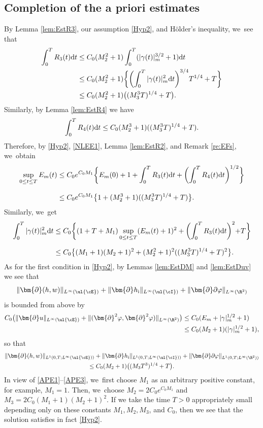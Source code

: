 \subsection{Completion of the a priori estimates}\label{sectAPE}
By Lemma \ref{lem:EstR3}, our assumption \eqref{Hyp2}, and Hölder's inequality, we~see that
\begin{align*}
\int_0^TR_3(t){\rm d}t
&\leq C_0(M_2^2+1)\int_0^T(|\gamma(t)|_m^{3/2}+1){\rm d}t \\
&\leq C_0(M_2^2+1)\biggl\{ \biggl(\int_0^T|\gamma(t)|_m^2{\rm d}t\biggr)^{3/4}T^{1/4} + T \biggl\} \\
&\leq C_0(M_2^2+1)\bigl((M_3^3T)^{1/4}+T\bigr).
\end{align*}
Similarly, by Lemma \ref{lem:EstR4} we have
\[
\int_0^TR_4(t){\rm d}t \leq C_0(M_2^3+1)((M_3^3T)^{1/4}+T).
\]
Therefore, by \eqref{Hyp2}, \eqref{NLEE1}, Lemma \ref{lem:EstR2}, and Remark \ref{re:EFs}, we~obtain
\begin{align}\label{APE1}
\sup_{0\leq t\leq T}E_m(t)
&\leq C_0 e^{C_0M_1}\biggl\{ E_m(0) + 1 + \int_0^TR_3(t){\rm d}t + \biggl(\int_0^TR_4(t){\rm d}t \biggr)^{1/2} \biggr\} \notag\\[-3pt] &\\[-5pt]
&\leq C_0 e^{C_0M_1}\bigl\{ 1 + (M_2^3+1)((M_3^3T)^{1/4}+T) \bigr\}.\notag
\end{align}
Similarly, we~get
\begin{align}\label{APE2}
\int_0^T|\gamma(t)|_m^2{\rm d}t
&\leq C_0 \biggl\{ (1+T+M_1)\sup_{0\leq t\leq T}(E_m(t)+1)^2 + \biggl(\int_0^TR_3(t){\rm d}t \biggl)^2 + T \biggr\}\notag \\ &\\[-10pt]
&\leq C_0 \bigl\{ (M_1+1)(M_2+1)^2 + (M_2^2+1)^2 ((M_3^3T)^{1/4}+T)^2 \bigr\}.\notag
\end{align}
As for the first condition in \eqref{Hyp2}, by Lemmas \ref{lem:EstDM} and \ref{lem:EstDuv} we see that
\[
\|\bm{\partial}(h,w)\|_{L^\infty(\ul{\cE})} + \|\bm{\partial} h_\mathrm{i}\|_{L^\infty(\ul{\cI})} + \|\bm{\partial}\partial\varphi\|_{L^\infty(\R^2)}
\]
is bounded from above by
\begin{align*}
C_0 \bigl(\|\bm{\partial}u\|_{L^\infty(\ul{\cE})} + \|(\bm{\partial}^2\varphi,\bm{\partial}^2\varphi)\|_{L^\infty(\R^2)} \bigr)
&\leq C_0 (E_m + |\gamma|_m^{1/2} + 1) \\
&\leq C_0(M_2+1)(|\gamma|_m^{1/2}+1),
\end{align*}
so that
\begin{multline}\label{APE3}
\|\bm{\partial}(h,w)\|_{L^1(0,T;L^\infty(\ul{\cE}))} + \|\bm{\partial} h_\mathrm{i}\|_{L^1(0,T;L^\infty(\ul{\cI}))}
+ \|\bm{\partial}\partial\varphi\|_{L^1(0,T;L^\infty(\R^2))} \\
\leq C_0(M_2+1)\bigl((M_3T^3)^{1/4}+T\bigr).
\end{multline}
In view of \eqref{APE1}--\eqref{APE3}, we~first choose $M_1$ as an arbitrary positive constant, for example, $M_1=1$.
Then, we~choose $M_2=2C_0e^{C_0M_1}$ and $M_3=2C_0(M_1+1)(M_2+1)^2$.
If we take the time $T>0$ appropriately small depending only on these constants $M_1,M_2,M_3$, and $C_0$,
then we see that the solution satisfies in fact \eqref{Hyp2}.

